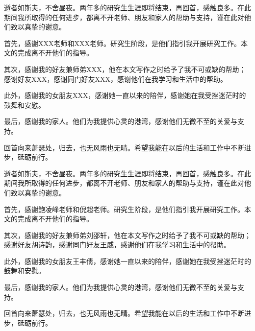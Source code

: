 \cleardoublepage
{}

{%


\hspace*{\fill}
    逝者如斯夫，不舍昼夜。两年多的研究生生涯即将结束，再回首，感触良多。在此期间我所取得的任何进步，都离不开老师、朋友和家人的帮助与支持，谨在此对他们致以真挚的谢意。

    首先，感谢XXX老师和XXX老师。研究生阶段，是他们指引我开展研究工作。本文的完成离不开他们的指导。

    其次，感谢我的好友兼师弟XXX，他在本文写作之时给予了我不可或缺的帮助；感谢好友XXX，感谢同门好友XXX，感谢他们在我学习和生活中的帮助。

    此外，感谢我的女朋友XXX，感谢她一直以来的陪伴，感谢她在我受挫迷茫时的鼓舞和安慰。

    最后，感谢我的家人。他们为我提供心灵的港湾，感谢他们无微不至的关爱与支持。

    回首向来萧瑟处，归去，也无风雨也无晴。希望我能在以后的生活和工作中不断进步，砥砺前行。

}
{%



\hspace*{\fill}
    逝者如斯夫，不舍昼夜。两年多的研究生生涯即将结束，再回首，感触良多。在此期间我所取得的任何进步，都离不开老师、朋友和家人的帮助与支持，谨在此对他们致以真挚的谢意。

    首先，感谢鲍凌峰老师和倪超老师。研究生阶段，是他们指引我开展研究工作。本文的完成离不开他们的指导。

    其次，感谢我的好友兼师弟刘邵轩，他在本文写作之时给予了我不可或缺的帮助；感谢好友胡诗韵，感谢同门好友王威，感谢他们在我学习和生活中的帮助。

    此外，感谢我的女朋友王丰倩，感谢她一直以来的陪伴，感谢她在我受挫迷茫时的鼓舞和安慰。

    最后，感谢我的家人。他们为我提供心灵的港湾，感谢他们无微不至的关爱与支持。

    回首向来萧瑟处，归去，也无风雨也无晴。希望我能在以后的生活和工作中不断进步，砥砺前行。

}